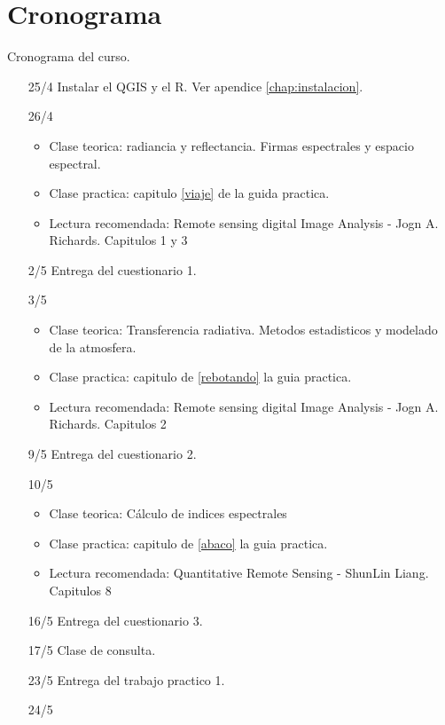\chapter{Cronograma}\label{chap:cronograma}

Cronograma del curso.

\begin{itemize}
  \item[25/4] Instalar el QGIS y el R. Ver apendice \ref{chap:instalacion}.
  \item[26/4] 
  \begin{itemize}
    \item Clase teorica: radiancia y reflectancia. Firmas espectrales y espacio espectral.
    \item Clase practica: capitulo \ref{viaje} de la guida practica.
    \item Lectura recomendada: Remote sensing digital Image Analysis - Jogn A. Richards. Capitulos 1 y 3
  \end{itemize}
  \item[2/5] Entrega del cuestionario 1.
  \item[3/5] 
  \begin{itemize}
    \item Clase teorica: Transferencia radiativa. Metodos estadisticos y modelado de la atmosfera.
    \item Clase practica: capitulo de \ref{rebotando} la guia practica.
    \item Lectura recomendada: Remote sensing digital Image Analysis - Jogn A. Richards. Capitulos 2
  \end{itemize}
  \item[9/5] Entrega del cuestionario 2.
  \item[10/5] 
  \begin{itemize}
    \item Clase teorica: C\'alculo de indices espectrales
    \item Clase practica: capitulo de \ref{abaco} la guia practica.
    \item Lectura recomendada: Quantitative Remote Sensing - ShunLin Liang. Capitulos 8
  \end{itemize}
  \item[16/5] Entrega del cuestionario 3.
  \item[17/5] Clase de consulta.
  \item[23/5] Entrega del trabajo practico 1.
  \item[24/5] 

\end{itemize}
